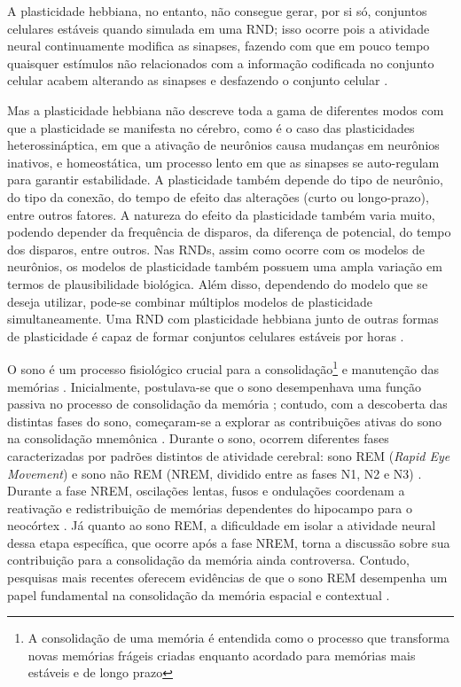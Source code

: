 A plasticidade hebbiana, no entanto, não consegue gerar, por si só, conjuntos celulares estáveis quando simulada em uma RND; isso
ocorre pois a atividade neural continuamente modifica as sinapses, fazendo com que em pouco tempo quaisquer estímulos não
relacionados com a informação codificada no conjunto celular acabem alterando as sinapses e desfazendo o conjunto celular
\cite{gerstnerSpiking2002}.

Mas a plasticidade hebbiana não descreve toda a gama de diferentes modos com que a plasticidade se manifesta no cérebro, como é o
caso das  plasticidades heterossináptica, em que a ativação de neurônios causa mudanças em neurônios inativos, e homeostática, um
processo lento em que as sinapses se auto-regulam para garantir estabilidade. A plasticidade também depende do tipo de neurônio,
do tipo da conexão, do tempo de efeito das alterações (curto ou longo-prazo), entre outros fatores. A natureza do efeito da
plasticidade também varia muito, podendo depender da frequência de disparos, da diferença de potencial, do tempo dos disparos,
entre outros. Nas RNDs, assim como ocorre com os modelos de neurônios, os modelos de plasticidade também possuem uma ampla
variação em termos de plausibilidade biológica. Além disso, dependendo do modelo que se deseja utilizar, pode-se combinar
múltiplos modelos de plasticidade simultaneamente. Uma RND com plasticidade hebbiana junto de outras formas de plasticidade é
capaz de formar conjuntos celulares estáveis por horas \cite{zenkeDiverse2015}.

O sono é um processo fisiológico crucial para a consolidação\footnote{A consolidação de uma memória é entendida como o processo
que transforma novas memórias frágeis criadas enquanto acordado para memórias mais estáveis e de longo prazo} e manutenção das
memórias \cite{blissittSleep2001, walkerSleep2006, diekelmannMemory2010}. Inicialmente, postulava-se que o sono desempenhava uma
função passiva no processo de consolidação da memória \cite{jenkinsObliviscence1924}; contudo, com a descoberta das distintas
fases do sono, começaram-se a explorar as contribuições ativas do sono na consolidação mnemônica \cite{aserinskyRegularly1953}.
Durante o sono, ocorrem diferentes fases caracterizadas por padrões distintos de atividade cerebral: sono REM (\textit{Rapid Eye
Movement}) e sono não REM (NREM, dividido entre as fases N1, N2 e N3) \cite{schulzRethinking2008}. Durante a fase NREM, oscilações
lentas, fusos e ondulações coordenam a reativação e redistribuição de memórias dependentes do hipocampo para o neocórtex
\cite{diekelmannMemory2010}. Já quanto ao sono REM, a dificuldade em isolar a atividade neural dessa etapa específica, que ocorre
após a fase NREM, torna a discussão sobre sua contribuição para a consolidação da memória ainda controversa. Contudo, pesquisas
mais recentes oferecem evidências de que o sono REM desempenha um papel fundamental na consolidação da memória espacial e
contextual \cite{boyceREM2017}.

